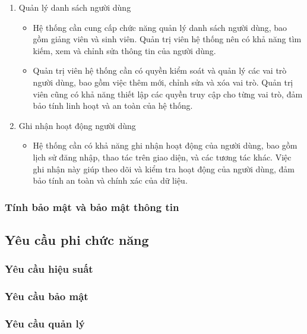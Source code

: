 \documentclass[../Thesis.tex]{subfiles}
\begin{document}
\begin{enumerate}
                \item Quản lý danh sách người dùng
                    \begin{itemize}[label=$\bullet$]
                        \item Hệ thống cần cung cấp chức năng quản lý danh sách người dùng, bao gồm giảng viên và sinh viên. Quản trị viên hệ thống nên có khả năng tìm kiếm, xem và chỉnh sửa thông tin của người dùng.

                        \item Quản trị viên hệ thống cần có quyền kiểm soát và quản lý các vai trò người dùng, bao gồm việc thêm mới, chỉnh sửa và xóa vai trò. Quản trị viên cũng có khả năng thiết lập các quyền truy cập cho từng vai trò, đảm bảo tính linh hoạt và an toàn của hệ thống.
                    \end{itemize}

                \item Ghi nhận hoạt động người dùng
                    \begin{itemize}[label=$\bullet$]
                        \item Hệ thống cần có khả năng ghi nhận hoạt động của người dùng, bao gồm lịch sử đăng nhập, thao tác trên giao diện, và các tương tác khác. Việc ghi nhận này giúp theo dõi và kiểm tra hoạt động của người dùng, đảm bảo tính an toàn và chính xác của dữ liệu.
                    \end{itemize}
            \end{enumerate}

        \subsubsection{Tính bảo mật và bảo mật thông tin}

    \subsection{Yêu cầu phi chức năng}
        \subsubsection{Yêu cầu hiệu suất}

        \subsubsection{Yêu cầu bảo mật}

        \subsubsection{Yêu cầu quản lý}
\end{document}
